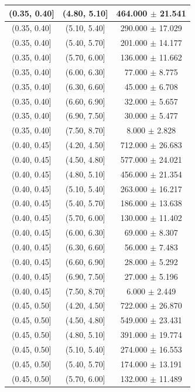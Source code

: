 \begin{longtable}{|c|c|c|}
\hline
(0.35, 0.40] & (4.80, 5.10] & 464.000 $\pm$ 21.541 \\ 
\hline
(0.35, 0.40] & (5.10, 5.40] & 290.000 $\pm$ 17.029 \\ 
\hline
(0.35, 0.40] & (5.40, 5.70] & 201.000 $\pm$ 14.177 \\ 
\hline
(0.35, 0.40] & (5.70, 6.00] & 136.000 $\pm$ 11.662 \\ 
\hline
(0.35, 0.40] & (6.00, 6.30] & 77.000 $\pm$ 8.775 \\ 
\hline
(0.35, 0.40] & (6.30, 6.60] & 45.000 $\pm$ 6.708 \\ 
\hline
(0.35, 0.40] & (6.60, 6.90] & 32.000 $\pm$ 5.657 \\ 
\hline
(0.35, 0.40] & (6.90, 7.50] & 30.000 $\pm$ 5.477 \\ 
\hline
(0.35, 0.40] & (7.50, 8.70] & 8.000 $\pm$ 2.828 \\ 
\hline
(0.40, 0.45] & (4.20, 4.50] & 712.000 $\pm$ 26.683 \\ 
\hline
(0.40, 0.45] & (4.50, 4.80] & 577.000 $\pm$ 24.021 \\ 
\hline
(0.40, 0.45] & (4.80, 5.10] & 456.000 $\pm$ 21.354 \\ 
\hline
(0.40, 0.45] & (5.10, 5.40] & 263.000 $\pm$ 16.217 \\ 
\hline
(0.40, 0.45] & (5.40, 5.70] & 186.000 $\pm$ 13.638 \\ 
\hline
(0.40, 0.45] & (5.70, 6.00] & 130.000 $\pm$ 11.402 \\ 
\hline
(0.40, 0.45] & (6.00, 6.30] & 69.000 $\pm$ 8.307 \\ 
\hline
(0.40, 0.45] & (6.30, 6.60] & 56.000 $\pm$ 7.483 \\ 
\hline
(0.40, 0.45] & (6.60, 6.90] & 28.000 $\pm$ 5.292 \\ 
\hline
(0.40, 0.45] & (6.90, 7.50] & 27.000 $\pm$ 5.196 \\ 
\hline
(0.40, 0.45] & (7.50, 8.70] & 6.000 $\pm$ 2.449 \\ 
\hline
(0.45, 0.50] & (4.20, 4.50] & 722.000 $\pm$ 26.870 \\ 
\hline
(0.45, 0.50] & (4.50, 4.80] & 549.000 $\pm$ 23.431 \\ 
\hline
(0.45, 0.50] & (4.80, 5.10] & 391.000 $\pm$ 19.774 \\ 
\hline
(0.45, 0.50] & (5.10, 5.40] & 274.000 $\pm$ 16.553 \\ 
\hline
(0.45, 0.50] & (5.40, 5.70] & 174.000 $\pm$ 13.191 \\ 
\hline
(0.45, 0.50] & (5.70, 6.00] & 132.000 $\pm$ 11.489 \\ 

\end{longtable}
